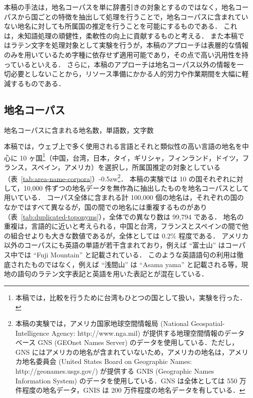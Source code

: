 \documentclass[japanese]{jnlp_1.4}
\begin{document}
本稿の手法は，地名コーパスを単に辞書引きの対象とするのではなく，地名コーパスから国ごとの特徴を抽出して処理を行うことで，地名コーパスに含まれていない地名に対しても所属国の推定を行うことを可能にするものである．
これは，未知語処理の頑健性，柔軟性の向上に貢献するものと考える．
また本稿ではラテン文字を処理対象として実験を行うが，本稿のアプローチは表層的な情報のみを用いているため字種に依存せず適用可能であり，その点で高い汎用性を持っているといえる．
さらに，本稿のアプローチは地名コーパス以外の情報を一切必要としないことから，リソース準備にかかる人的労力や作業期間を大幅に軽減するものである．


\subsection{地名コーパス}
\label{sec:area-name-corpora}

\begin{table}[b]
  \caption{地名コーパスに含まれる地名数，単語数，文字数}
  \label{tab:area-name-corpora}

\vspace{-1\baselineskip}
\end{table}

本稿では，ウェブ上で多く使用される言語とそれと類似性の高い言語の地名を中心に 10 ヶ国\footnote{本稿では，比較を行うために台湾もひとつの国として扱い，実験を行った．}（中国，台湾，日本，タイ，ギリシャ，フィンランド，ドイツ，フランス，スペイン，アメリカ）を選択し，所属国推定の対象としている（表~\ref{tab:area-name-corpora}）\kern-0.5zw\footnote{本稿の実験では，アメリカ国家地球空間情報局 (National Geospatial-Intelligence Agency: http://www.nga.mil) が提供する地理空間情報のデータベース GNS (GEOnet Names Server) のデータを使用している．ただし，GNS にはアメリカの地名が含まれていないため，アメリカの地名は，アメリカ地名委員会 (United States Board on Geographic Names: http://geonames.usgs.gov/) が提供する GNIS (Geographic Names Information System) のデータを使用している．GNS は全体としては 550 万件程度の地名データ，GNIS は 200 万件程度の地名データを有している．}．
本稿の実験では 10 の国それぞれに対して，10,000 件ずつの地名データを無作為に抽出したものを地名コーパスとして用いている．
コーパス全体に含まれる計 100,000 個の地名は，それぞれの国のなかではすべて異なるが，国の間での地名には重複するものがあり（表~\ref{tab:duplicated-toponyms}），全体での異なり数は 99,794 である．
地名の重複は，言語的に近いと考えられる，中国と台湾，フランスとスペインの間で他の組合せよりも大きな数値であるが，全体としては 0.2\% 程度である．
アメリカ以外のコーパスにも英語の単語が若干含まれており，例えば ``富士山'' はコーパス中では ``Fuji Mountain'' と記載されている．
このような英語語句の利用は徹底されたものではなく，例えば ``浅間山'' は ``Asama yama'' と記載される等，現地の語句のラテン文字表記と英語を用いた表記とが混在している．
\end{document}
